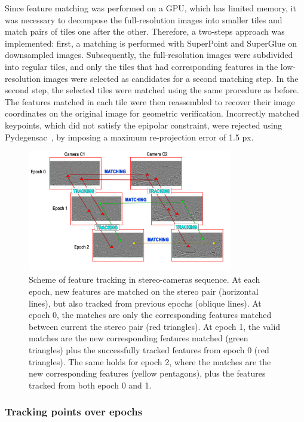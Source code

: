 Since feature matching was performed on a GPU, which has limited memory, it was necessary
to decompose the full-resolution images into smaller tiles and match pairs of tiles one
after the other.
Therefore, a two-steps approach was implemented: first, a matching is performed with
SuperPoint and SuperGlue on downsampled images. Subsequently, the
full-resolution images were subdivided into regular tiles, and only the tiles that had
corresponding features in the low-resolution images were selected as candidates for a
second matching step.
In the second step, the selected tiles were matched using the same procedure as before.
The features matched in each tile were then reassembled to recover their image
coordinates on the original image for geometric verification.
Incorrectly matched keypoints, which did not satisfy the epipolar constraint, were
rejected using Pydegensac~\citep{Mishkin2015_pydegensac}, by imposing a maximum
re-projection error of 1.5 px.

\begin{figure}[ht]
  \centering
  \includegraphics[width=0.8\textwidth]{3_tracking.png}
  \caption{Scheme of feature tracking in stereo-cameras sequence. At each epoch, new
    features are matched on the stereo pair (horizontal lines), but also tracked from
    previous epochs (oblique lines).
    At epoch 0, the matches are only the corresponding features matched
    between	current the stereo pair (red triangles).
    At epoch 1, the valid matches are the new corresponding features matched (green
    triangles) plus the successfully tracked features from epoch 0 (red triangles).
    The same holds for epoch 2, where the matches are the new
    corresponding features (yellow pentagons), plus the features tracked from both epoch
    0 and 1.}
  \label{fig:4:tracking}
\end{figure}

\subsubsection{Tracking points over epochs}\label{sec:4:tracking}

